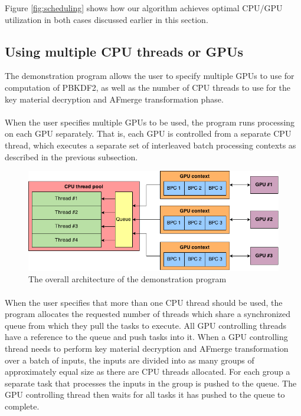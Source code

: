 \documentclass[12pt,oneside]{fithesis2}
\begin{document}
      Figure \ref{fig:scheduling} shows how our algorithm achieves optimal CPU/GPU utilization in both cases discussed earlier in this section.
      
      \subsection{Using multiple CPU threads or GPUs}
      The demonstration program allows the user to specify multiple GPUs to use for computation of PBKDF2, as well as the number of CPU threads to use for the key material decryption and AFmerge transformation phase.
      
      \paragraph*{}
      When the user specifies multiple GPUs to be used, the program runs processing on each GPU separately. That is, each GPU is controlled from a separate CPU thread, which executes a separate set of interleaved batch processing contexts as described in the previous subsection.
      
      \begin{figure}[hb]
        \centering
        \includegraphics[width=\linewidth]{images/lukscrack-gpu-architecture.png}
        \caption{The overall architecture of the demonstration program}
        \label{fig:lukscrackArch}
      \end{figure}
      
      \paragraph*{}
      When the user specifies that more than one CPU thread should be used, the program allocates the requested number of threads which share a synchronized queue from which they pull the tasks to execute. All GPU controlling threads have a reference to the queue and push tasks into it. When a GPU controlling thread needs to perform key material decryption and AFmerge transformation over a batch of inputs, the inputs are divided into as many groups of approximately equal size as there are CPU threads allocated. For each group a separate task that processes the inputs in the group is pushed to the queue. The GPU controlling thread then waits for all tasks it has pushed to the queue to complete.
      
\end{document}
